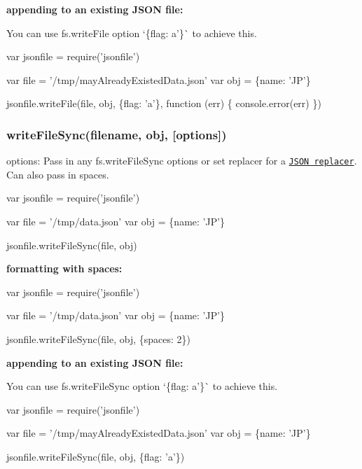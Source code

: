 {\bfseries appending to an existing J\+S\+ON file\+:}

You can use {\ttfamily fs.\+write\+File} option `\{flag\+: \textquotesingle{}a'\}\`{} to achieve this.


\begin{DoxyCode}
var jsonfile = require('jsonfile')

var file = '/tmp/mayAlreadyExistedData.json'
var obj = \{name: 'JP'\}

jsonfile.writeFile(file, obj, \{flag: 'a'\}, function (err) \{
  console.error(err)
\})
\end{DoxyCode}


\subsubsection*{write\+File\+Sync(filename, obj, \mbox{[}options\mbox{]})}

{\ttfamily options}\+: Pass in any {\ttfamily fs.\+write\+File\+Sync} options or set {\ttfamily replacer} for a \href{https://developer.mozilla.org/en-US/docs/Web/JavaScript/Reference/Global_Objects/JSON/stringify}{\tt J\+S\+ON replacer}. Can also pass in {\ttfamily spaces}.


\begin{DoxyCode}
var jsonfile = require('jsonfile')

var file = '/tmp/data.json'
var obj = \{name: 'JP'\}

jsonfile.writeFileSync(file, obj)
\end{DoxyCode}


{\bfseries formatting with spaces\+:}


\begin{DoxyCode}
var jsonfile = require('jsonfile')

var file = '/tmp/data.json'
var obj = \{name: 'JP'\}

jsonfile.writeFileSync(file, obj, \{spaces: 2\})
\end{DoxyCode}


{\bfseries appending to an existing J\+S\+ON file\+:}

You can use {\ttfamily fs.\+write\+File\+Sync} option `\{flag\+: \textquotesingle{}a'\}\`{} to achieve this.


\begin{DoxyCode}
var jsonfile = require('jsonfile')

var file = '/tmp/mayAlreadyExistedData.json'
var obj = \{name: 'JP'\}

jsonfile.writeFileSync(file, obj, \{flag: 'a'\})
\end{DoxyCode}


